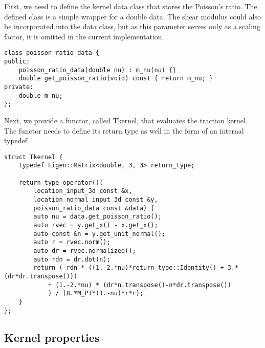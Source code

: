\documentclass{article}
\begin{document}
First, we need to define the kernel data class that stores the Poisson's ratio.
The defined class is a simple wrapper for a double data.
The shear modulus could also be incorporated into the data class, but as this parameter serves only as a scaling factor, it is omitted in the current implementation.

\begin{lstlisting}
class poisson_ratio_data {
public:
	poisson_ratio_data(double nu) :	m_nu(nu) {}
	double get_poisson_ratio(void) const { return m_nu; }
private:
	double m_nu;
};
\end{lstlisting}

Next, we provide a functor, called Tkernel, that evaluates the traction kernel. The functor needs to define its return type as well in the form of an internal typedef.

\begin{lstlisting}
struct Tkernel {
	typedef Eigen::Matrix<double, 3, 3> return_type;
	
	return_type operator()(
		location_input_3d const &x,
		location_normal_input_3d const &y,
		poisson_ratio_data const &data) {
		auto nu = data.get_poisson_ratio();
		auto rvec = y.get_x() - x.get_x();
		auto const &n = y.get_unit_normal();
		auto r = rvec.norm();
		auto dr = rvec.normalized();
		auto rdn = dr.dot(n);
		return (-rdn * ((1.-2.*nu)*return_type::Identity() + 3.*(dr*dr.transpose()))
			+ (1.-2.*nu) * (dr*n.transpose()-n*dr.transpose())
			) / (8.*M_PI*(1.-nu)*r*r);
	}
};
\end{lstlisting}

\subsection{Kernel properties}
\end{document}
